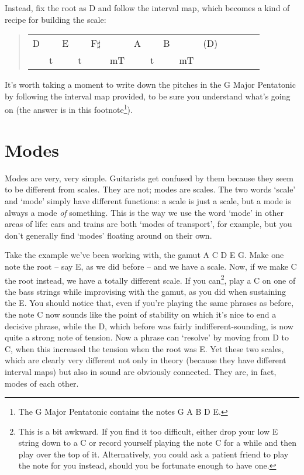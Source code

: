 \documentclass[english]{./gbook}
\begin{document}
\begin{large}
Instead, fix the root as D and follow the interval map, which becomes a kind of recipe for building the scale:
\begin{quote}
\begin{tabular}{rrrrrrrrrrrrrrr}
	D &&E &&F$\sharp$ &&A &&B &&(D)\\
	 &t && t&&mT &&t &&mT &
\end{tabular}
\end{quote}
It's worth taking a moment to write down the pitches in the G Major Pentatonic by following the interval map provided, to be sure you understand what's going on (the answer is in this footnote\footnote{The G Major Pentatonic contains the notes G A B D E.}).

\section*{Modes}

Modes are very, very simple. Guitarists get confused by them because they seem to be different from scales. They are not; modes are scales. The two words `scale' and `mode' simply have different functions: a scale is just a scale, but a mode is always a mode \emph{of} something. This is the way we use the word `mode' in other areas of life: cars and trains are both `modes of transport', for example, but you don't generally find `modes' floating around on their own.

Take the example we've been working with, the gamut A C D E G. Make one note the root -- say E, as we did before -- and we have a scale. Now, if we make C the root instead, we have a totally different scale. If you can\footnote{This is a bit awkward. If you find it too difficult, either drop your low E string down to a C or record yourself playing the note C for a while and then play over the top of it. Alternatively, you could ask a patient friend to play the note for you instead, should you be fortunate enough to have one.}, play a C on one of the bass strings while improvising with the gamut, as you did when sustaining the E. You should notice that, even if you're playing the same phrases as before, the note C now sounds like the point of stability on which it's nice to end a decisive phrase, while the D, which before was fairly indifferent-sounding, is now quite a strong note of tension. Now a phrase can `resolve' by moving from D to C, when this increased the tension when the root was E. Yet these two scales, which are clearly very different not only in theory (because they have different interval maps) but also in sound are obviously connected. They are, in fact, modes of each other.


\end{large}
\end{document}
